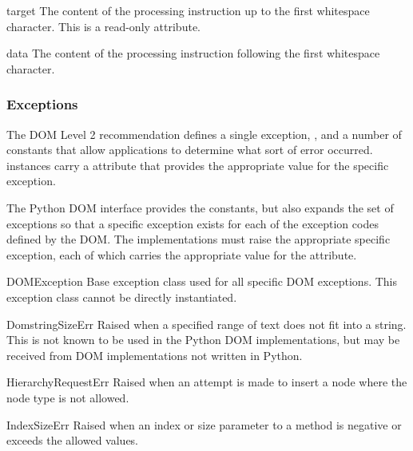 \begin{memberdesc}[ProcessingInstruction]{target}
The content of the processing instruction up to the first whitespace
character.  This is a read-only attribute.
\end{memberdesc}

\begin{memberdesc}[ProcessingInstruction]{data}
The content of the processing instruction following the first
whitespace character.
\end{memberdesc}


\subsubsection{Exceptions \label{dom-exceptions}}


The DOM Level 2 recommendation defines a single exception,
, and a number of constants that allow
applications to determine what sort of error occurred.
 instances carry a  attribute
that provides the appropriate value for the specific exception.

The Python DOM interface provides the constants, but also expands the
set of exceptions so that a specific exception exists for each of the
exception codes defined by the DOM.  The implementations must raise
the appropriate specific exception, each of which carries the
appropriate value for the  attribute.

\begin{excdesc}{DOMException}
  Base exception class used for all specific DOM exceptions.  This
  exception class cannot be directly instantiated.
\end{excdesc}

\begin{excdesc}{DomstringSizeErr}
  Raised when a specified range of text does not fit into a string.
  This is not known to be used in the Python DOM implementations, but
  may be received from DOM implementations not written in Python.
\end{excdesc}

\begin{excdesc}{HierarchyRequestErr}
  Raised when an attempt is made to insert a node where the node type
  is not allowed.
\end{excdesc}

\begin{excdesc}{IndexSizeErr}
  Raised when an index or size parameter to a method is negative or
  exceeds the allowed values.
\end{excdesc}

